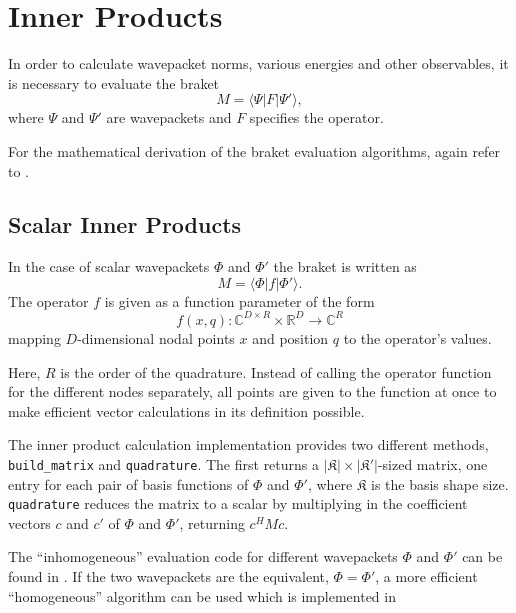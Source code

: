\section{Inner Products}

In order to calculate wavepacket norms, various energies and other observables,
it is necessary to evaluate the braket
\begin{equation}
  \label{eq:braket}
  M = \langle \Psi | F | \Psi' \rangle,
\end{equation}
where $\Psi$ and $\Psi'$ are wavepackets and $F$ specifies the operator.

For the mathematical derivation of the braket evaluation algorithms, again refer
to \cite{B_master_thesis}.


\subsection{Scalar Inner Products}

In the case of scalar wavepackets $\Phi$ and $\Phi'$ the braket is written as
\begin{equation}
  M = \langle \Phi | f | \Phi' \rangle.
\end{equation}
The operator $f$ is given as a function parameter of the form
\begin{equation}
  f(x, q) : \mathbb{C}^{D \times R} \times \mathbb{R}^D \rightarrow \mathbb{C}^R
\end{equation}
mapping $D$-dimensional nodal points $x$ and position
$q$ to the operator's values.

Here, $R$ is the order of the quadrature.
Instead of calling the operator function for the different nodes separately, all
points are given to the function at once to make efficient vector calculations
in its definition possible.

The inner product calculation implementation provides two different methods,
\texttt{build\_matrix} and \texttt{quadrature}.
The first returns a $|\mathfrak{K}| \times |\mathfrak{K'}|$-sized matrix, one
entry for each pair of basis functions of $\Phi$ and $\Phi'$, where
$\mathfrak{K}$ is the basis shape size.
\texttt{quadrature} reduces the matrix to a scalar by multiplying in the
coefficient vectors $c$ and $c'$ of $\Phi$ and $\Phi'$, returning $c^H M c$.

The ``inhomogeneous'' evaluation code for different wavepackets $\Phi$ and
$\Phi'$ can be found in .
If the two wavepackets are the equivalent, $\Phi = \Phi'$, a more efficient
``homogeneous'' algorithm can be used which is implemented in


